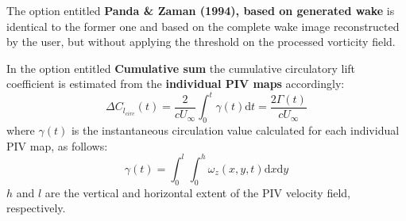 \documentclass[12pt,a4paper]{article}
\begin{document}
The option entitled \textbf{Panda \& Zaman (1994), based on generated wake} is identical to the former one and based on the complete wake image reconstructed by the user, but without applying the threshold on the processed vorticity field. 

In the option entitled \textbf{Cumulative sum} the cumulative circulatory lift coefficient is estimated from the \textbf{individual PIV maps} accordingly:
\begin{equation}
\Delta C_{l_{circ}}(t) = \frac{2}{cU_\infty} \int_0^t \gamma(t)\mathrm{d}t = \frac{2\Gamma(t)}{cU_\infty}
\label{eq:dCl-circ_option4}
\end{equation}
where $\gamma(t)$ is the instantaneous circulation value calculated for each individual PIV map, as follows:
\begin{equation}
\gamma(t) = \int_0^l \int_0^h \omega_z(x,y,t)\mathrm{d}x\mathrm{d}y
\label{eq:gamma_option4}
\end{equation}
$h$ and $l$ are the vertical and horizontal extent of the PIV velocity field, respectively.

\clearpage


\end{document}
